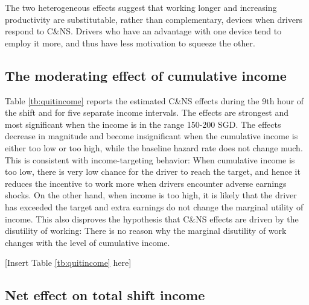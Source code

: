\documentclass[reviewmode]{restat}
\begin{document}
The two heterogeneous effects suggest that working longer and increasing productivity are substitutable, 
rather than complementary, devices when drivers respond to C\&NS. Drivers who have an advantage with one 
device tend to employ it more, and thus have less motivation to squeeze the other.

\subsection{The moderating effect of cumulative income} Table \ref{tb:quitincome} reports the estimated 
C\&NS effects during the 9th hour of the shift and for five separate income intervals. The effects are 
strongest and most significant when the income is in the range 150-200 SGD. The effects decrease in
magnitude and become insignificant when the cumulative income is either too low or too high, while the
baseline hazard rate does not change much. This is consistent with income-targeting behavior: When 
cumulative income is too low, there is very low chance for the driver to reach the target, and hence 
it reduces the incentive to work more when drivers encounter adverse earnings shocks. On the other hand,
when income is too high, it is likely that the driver has exceeded the target and extra earnings do not 
change the marginal utility of income. This also disproves the hypothesis that C\&NS effects are driven 
by the disutility of working: There is no reason why the marginal disutility of work changes with the 
level of cumulative income.

\begin{center}
	[Insert Table \ref{tb:quitincome} here]
\end{center}

\subsection{Net effect on total shift income}
\end{document}
